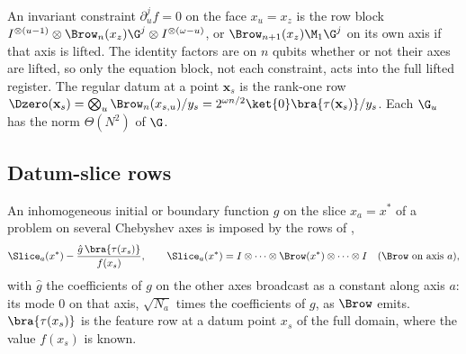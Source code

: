 An invariant constraint $\partial_u^{j}f=0$ on the face $x_u=x_z$ is the row block $I^{\otimes(u-1)}\otimes\Brow_n(x_z)\G^{j}\otimes I^{\otimes(\omega-u)}$, or $\Brow_{n+1}(x_z)\M_1\G^{j}$ on its own axis if that axis is lifted. The identity factors are on $n$ qubits whether or not their axes are lifted, so only the equation block, not each constraint, acts into the full lifted register. The regular datum at a point $\mathbf x_s$ is the rank-one row $\Dzero(\mathbf x_s)=\bigotimes_u\Brow_n(x_{s,u})/y_s=2^{\omega n/2}\ket{0}\bra{\tau(\mathbf x_s)}/y_s$. Each $\G_u$ has the norm $\Theta(N^2)$ of $\G$.

\subsection{Datum-slice rows}
\label{app:datum-slice}

An inhomogeneous initial or boundary function $g$ on the slice $x_a=x^*$ of a problem on several Chebyshev axes is imposed by the rows of ,
\begin{equation*}
    \Slice_a(x^*)-\frac{\hat g\,\bra{\tau(x_s)}}{f(x_s)}, \qquad \Slice_a(x^*)=I\otimes\dots\otimes\Brow(x^*)\otimes\dots\otimes I\quad(\Brow \text{ on axis } a),
\end{equation*}
with $\hat g$ the coefficients of $g$ on the other axes broadcast as a constant along axis $a$: its mode $0$ on that axis, $\sqrt{N_a}$ times the coefficients of $g$, as $\Brow$ emits. $\bra{\tau(x_s)}$ is the feature row at a datum point $x_s$ of the full domain, where the value $f(x_s)$ is known.

